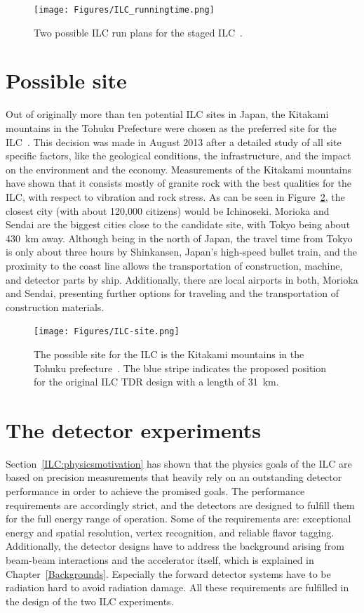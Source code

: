 \begin{figure}[htbp]
\centering
\texttt{[image: Figures/ILC\_runningtime.png]}
\caption[ILC run plan]{Two possible ILC run plans for the staged ILC~\cite[p. 8]{PhysicsCase}.}
\label{fig:ILC_runningtime}
\end{figure}

\section{Possible site}
Out of originally more than ten potential ILC sites in Japan, the Kitakami mountains in the Tohuku Prefecture were chosen as the preferred site for the ILC~\cite{Site}.
This decision was made in August 2013 after a detailed study of all site specific factors, like the geological conditions, the infrastructure, and the impact on the environment and the economy.
Measurements of the Kitakami mountains have shown that it consists mostly of granite rock with the best qualities for the ILC, with respect to vibration and rock stress.
As can be seen in Figure~\ref{fig:ILC_Site}, the closest city (with about 120,000 citizens) would be Ichinoseki.
Morioka and Sendai are the biggest cities close to the candidate site, with Tokyo being about \SI{430}{\kilo\meter} away.
Although being in the north of Japan, the travel time from Tokyo is only about three hours by Shinkansen, Japan's high-speed bullet train, and the proximity to the coast line allows the transportation of construction, machine, and detector parts by ship.
Additionally, there are local airports in both, Morioka and Sendai, presenting further options for traveling and the transportation of construction materials.
\label{ILC:site}
\begin{figure}[h]
\centering
\texttt{[image: Figures/ILC-site.png]}
\caption[Possible site for the ILC]{The possible site for the ILC is the Kitakami mountains in the Tohuku prefecture~\cite{Kitakami}.
The blue stripe indicates the proposed position for the original ILC TDR design with a length of \SI{31}{\kilo\meter}.}
\label{fig:ILC_Site}
\end{figure}


\section{The detector experiments}
\label{ILC:detectors}
Section~\ref{ILC:physicsmotivation} has shown that the physics goals of the ILC are based on precision measurements that heavily rely on an outstanding detector performance in order to achieve the promised goals.
The performance requirements are accordingly strict, and the detectors are designed to fulfill them for the full energy range of operation.
Some of the requirements are: exceptional energy and spatial resolution, vertex recognition, and reliable flavor tagging.
Additionally, the detector designs have to address the background arising from beam-beam interactions and the accelerator itself, which is explained in Chapter~\ref{Backgrounds}.
Especially the forward detector systems have to be radiation hard to avoid radiation damage.
All these requirements are fulfilled in the design of the two ILC experiments.

